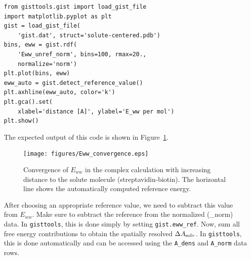 \documentclass[9pt,tutorial]{livecoms}
\newcommand{\dasolv}{\Delta A_\textup{solv}}
\newcommand{\software}{\texttt}
\newcommand\inlinecode{\texttt}
\begin{document}
\begin{lstlisting}[style=python]
from gisttools.gist import load_gist_file
import matplotlib.pyplot as plt
gist = load_gist_file(
    'gist.dat', struct='solute-centered.pdb')
bins, eww = gist.rdf(
    'Eww_unref_norm', bins=100, rmax=20.,
    normalize='norm')
plt.plot(bins, eww)
eww_auto = gist.detect_reference_value()
plt.axhline(eww_auto, color='k')
plt.gca().set(
    xlabel='distance [A]', ylabel='E_ww per mol')
plt.show()
\end{lstlisting}
The expected output of this code is shown in Figure~\ref{fig_ewwref}.
\begin{figure}
	\centering
	\texttt{[image: figures/Eww\_convergence.eps]}
	\caption{Convergence of $E_{ww}$ in the complex calculation with increasing distance to the solute molecule (streptavidin-biotin). The horizontal line shows the automatically computed reference energy.}\label{fig_ewwref}
\end{figure}
After choosing an appropriate reference value, we need to subtract this value from $E_{ww}$.
Make sure to subtract the reference from the normalized (\_norm) data.
In \software{gisttools}, this is done simply by setting \inlinecode{gist.eww\_ref}.
Now, sum all free energy contributions to obtain the spatially resolved $\dasolv$.
In \software{gisttools}, this is done automatically and can be accessed using the \inlinecode{A\_dens} and \inlinecode{A\_norm} data rows.
\end{document}

